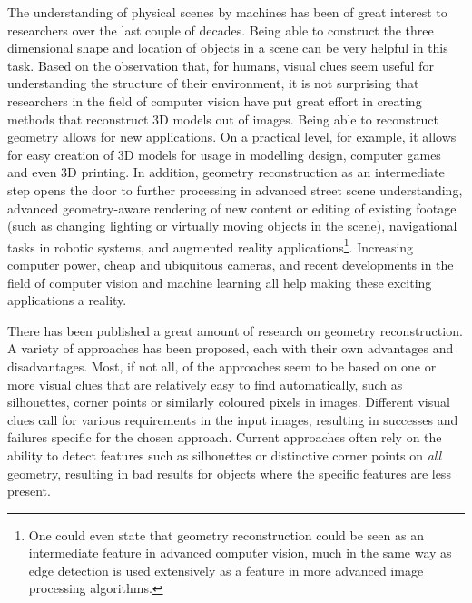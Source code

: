 
The understanding of physical scenes by machines has been of great interest to researchers over the last couple of decades. Being able to construct the three dimensional shape and location of objects in a scene can be very helpful in this task. Based on the observation that, for humans, visual clues seem useful for understanding the structure of their environment, it is not surprising that researchers in the field of computer vision have put great effort in creating methods that reconstruct 3D models out of images. Being able to reconstruct geometry allows for new applications. On a practical level, for example, it allows for easy creation of 3D models for usage in modelling design, computer games and even 3D printing. In addition, geometry reconstruction as an intermediate step opens the door to further processing in advanced street scene understanding, advanced geometry-aware rendering of new content or editing of existing footage (such as changing lighting or virtually moving objects in the scene), navigational tasks in robotic systems, and augmented reality applications\footnote{One could even state that geometry reconstruction could be seen as an intermediate feature in advanced computer vision, much in the same way as edge detection is used extensively as a feature in more advanced image processing algorithms.}. Increasing computer power, cheap and ubiquitous cameras, and recent developments in the field of computer vision and machine learning all help making these exciting applications a reality.

There has been published a great amount of research on geometry reconstruction. A variety of approaches has been proposed, each with their own advantages and disadvantages. Most, if not all, of the approaches seem to be based on one or more visual clues that are relatively easy to find automatically, such as silhouettes, corner points or similarly coloured pixels in images. Different visual clues call for various requirements in the input images, resulting in successes and failures specific for the chosen approach. Current approaches often rely on the ability to detect features such as silhouettes or distinctive corner points on \emph{all} geometry, resulting in bad results for objects where the specific features are less present.

